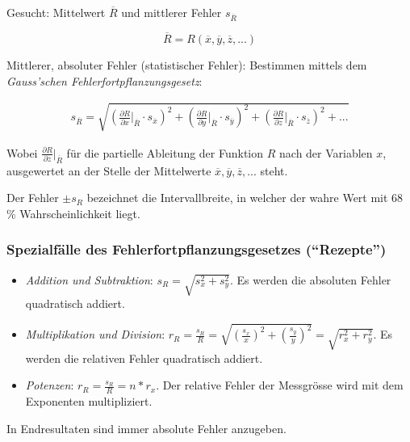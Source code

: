 Gesucht: Mittelwert $\overline{R}$ und mittlerer Fehler $s_{\overline{R}}$

\begin{equation}
    \overline{R} = R(\overline{x},\overline{y},\overline{z},...)
\end{equation}

Mittlerer,  absoluter  Fehler  (statistischer Fehler): Bestimmen  mittels  dem
\emph{Gauss'schen Fehlerfortpflanzungsgesetz}:

\begin{gather}
    s_{\overline{R}} = \sqrt{ \left( \frac{\partial R}{\partial x} \biggr\rvert_{\overline{R}} \cdot s_{\overline{x}}\right)^2
                            + \left( \frac{\partial R}{\partial y} \biggr\rvert_{\overline{R}} \cdot s_{\overline{y}}\right)^2
                            + \left( \frac{\partial R}{\partial z} \biggr\rvert_{\overline{R}} \cdot s_{\overline{z}}\right)^2
                            + ... }
\end{gather}

Wobei  $\frac{\partial R}{\partial  z}  \bigr\rvert_{\overline{R}}$ f\"ur  die
partielle Ableitung  der Funktion $R$  nach der Variablen $x$,  ausgewertet an
der Stelle  der Mittelwerte  $\overline{x}, \overline{y}, \overline{z},  ... $
steht.

Der Fehler $\pm s_R$ bezeichnet die Intervallbreite, in welcher der wahre Wert
mit 68 \% Wahrscheinlichkeit liegt.

\subsubsection{Spezialf\"alle des Fehlerfortpflanzungsgesetzes (``Rezepte'')}

\begin{itemize}
    \item
        \emph{Addition  und Subtraktion}:  $s_R  =  \sqrt{s_x^2 +  s_y^2}$. Es
        werden die absoluten Fehler quadratisch addiert.
    \item
        \emph{Multiplikation   und   Division}:   $r_R   =   \frac{s_R}{R}   =
        \sqrt{(\frac{s_x}{x})^2   +   (\frac{s_y}{y})^2}   =   \sqrt{r_x^2   +
        r_y^2}$. Es werden die relativen Fehler quadratisch addiert.
    \item
        \emph{Potenzen}: $r_R = \frac{s_R}{R} =  n * r_x$. Der relative Fehler
        der Messgr\"osse wird mit dem Exponenten multipliziert.
\end{itemize}

In Endresultaten sind immer absolute Fehler anzugeben.
